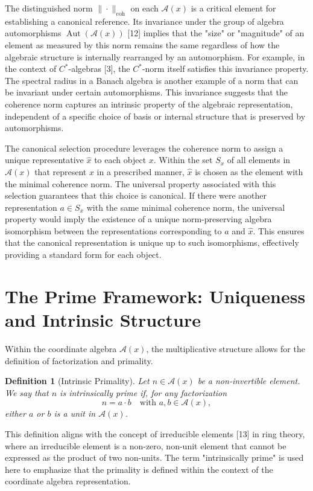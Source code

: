 \documentclass{article}
\newtheorem{definition}[theorem]{Definition}
\begin{document}
The distinguished norm $\|\cdot\|_{\mathrm{coh}}$ on each $\mathcal{A}(x)$ is a critical element for establishing a canonical reference. Its invariance under the group of algebra automorphisms $\operatorname{Aut}(\mathcal{A}(x))$ [12] implies that the "size" or "magnitude" of an element as measured by this norm remains the same regardless of how the algebraic structure is internally rearranged by an automorphism. For example, in the context of $C^*$-algebras [3], the $C^*$-norm itself satisfies this invariance property. The spectral radius in a Banach algebra is another example of a norm that can be invariant under certain automorphisms. This invariance suggests that the coherence norm captures an intrinsic property of the algebraic representation, independent of a specific choice of basis or internal structure that is preserved by automorphisms.

The canonical selection procedure leverages the coherence norm to assign a unique representative $\hat{x}$ to each object $x$. Within the set $S_x$ of all elements in $\mathcal{A}(x)$ that represent $x$ in a prescribed manner, $\hat{x}$ is chosen as the element with the minimal coherence norm. The universal property associated with this selection guarantees that this choice is canonical. If there were another representation $a \in S_x$ with the same minimal coherence norm, the universal property would imply the existence of a unique norm-preserving algebra isomorphism between the representations corresponding to $a$ and $\hat{x}$. This ensures that the canonical representation is unique up to such isomorphisms, effectively providing a standard form for each object.

\section{The Prime Framework: Uniqueness and Intrinsic Structure}

Within the coordinate algebra $\mathcal{A}(x)$, the multiplicative structure allows for the definition of factorization and primality.

\begin{definition}[Intrinsic Primality]
Let $n \in \mathcal{A}(x)$ be a non-invertible element. We say that $n$ is \emph{intrinsically prime} if, for any factorization
\[
n = a \cdot b \quad \text{with } a, b \in \mathcal{A}(x),
\]
either $a$ or $b$ is a unit in $\mathcal{A}(x)$.
\end{definition}

This definition aligns with the concept of irreducible elements [13] in ring theory, where an irreducible element is a non-zero, non-unit element that cannot be expressed as the product of two non-units. The term "intrinsically prime" is used here to emphasize that the primality is defined within the context of the coordinate algebra representation.
\end{document}
